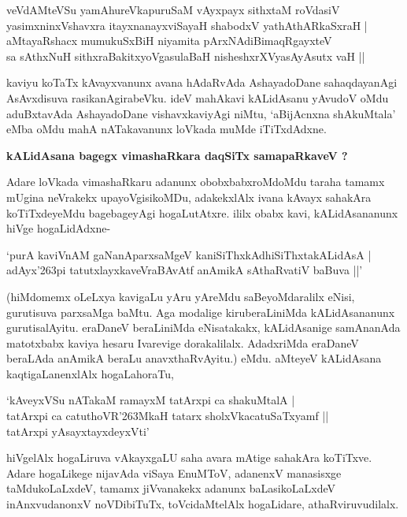 \begin{shloka}
veVdAMteVSu yamAhureVkapuruSaM vAyxpayx sithxtaM roVdasiV\\\label{232}
yasimxninxVshavxra itayxnanayxviSayaH shabodxV yathAthARkaSxraH |\\
aMtayaRshacx mumukuSxBiH niyamita pArxNAdiBimaqRgayxteV \\
sa sAthxNuH sithxraBakitxyoVgasulaBaH nisheshxrXVyasAyAsutx vaH ||
\end{shloka}

kaviyu koTaTx kAvayxvanunx avana hAdaRvAda AshayadoDane sahaqdayanAgi AsAvxdisuva rasika\-nAgira\-beVku. ideV mahAkavi kALidAsanu yAvudoV oMdu aduBxtavAda AshayadoDane vishavxkavi\-yAgi niMtu, `aBijAcnxna shAkuMtala' eMba oMdu mahA nATakavanunx loVkada muMde iTiTxdAdxne.

{\bigskip
\noindent
{\large\bf kALidAsana bagegx vimashaRkara daqSiTx samapaRkaveV ?}}
\medskip

\noindent
Adare loVkada vimashaRkaru adanunx obobxbabxroMdoMdu taraha tamamx mUgina neVrakekx upa\-yoVgisikoMDu, adakekxlAlx ivana kAvayx sahakAra koTiTxdeyeMdu bagebageyAgi hogaLutAtxre. ililx obabx kavi, kALidAsananunx hiVge hogaLidAdxne-

\begin{shloka}
`purA kaviVnAM gaNanAparxsaMgeV kaniSiThxkAdhiSiThxtakALidAsA |\\\label{233}
adAyx\char'263pi tatutxlayxkaveVraBAvAtf anAmikA sAthaRvatiV baBuva ||'
\end{shloka}

\noindent
(hiMdomemx oLeLxya kavigaLu yAru yAreMdu saBeyoMdaralilx eNisi, gurutisuva parxsaMga baMtu. Aga modalige kiruberaLiniMda kALidAsananunx gurutisalAyitu. eraDaneV beraLiniMda eNisa\-takakx, kALidAsanige samAnanAda matotxbabx kaviya hesaru Ivarevige dorakalilalx. AdadxriMda eraDaneV beraLAda anAmikA beraLu anavxthaRvAyitu.) eMdu. aMteyeV kALidAsana kaqtigaLanenxlAlx hogaLa\-horaTu,

\begin{shloka}
`kAveyxVSu nATakaM ramayxM tatArxpi ca shakuMtalA |\\\label{233}
tatArxpi ca catuthoVR\char'263MkaH tatarx sholxVkacatuSaTxyamf ||\\
tatArxpi yAsayxtayxdeyxVti'
\end{shloka}

\noindent
hiVgelAlx hogaLiruva vAkayxgaLU saha avara mAtige sahakAra koTiTxve. Adare hogaLikege nija\-vAda viSaya EnuMToV, adanenxV manasisxge taMdukoLaLxdeV, tamamx jiVvanakekx adanunx baLasikoLaLxdeV inAnxvu\-danonxV noVDibiTuTx, toVcidaMtelAlx hogaLidare, athaRviruvudilalx.

